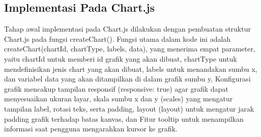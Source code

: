 \subsection{Implementasi Pada Chart.js}
Tahap awal implementasi pada Chart.js dilakukan dengan pembuatan struktur Chart.js pada fungsi createChart(). Fungsi utama dalam kode ini adalah createChart(chartId, chartType, labels, data), yang menerima empat parameter, yaitu chartId untuk memberi id grafik yang akan dibuat, chartType untuk mendefinisikan jenis chart yang akan dibuat, labels untuk menandakan sumbu x, dan variabel data yang akan ditampilkan di dalam grafik sumbu y,  Konfigurasi grafik mencakup tampilan responsif (responsive: true) agar grafik dapat menyesuaikan ukuran layar, skala sumbu x dan y (scales) yang mengatur tampilan label, rotasi teks, serta padding, layout (layout) untuk mengatur jarak padding grafik terhadap batas kanvas, dan Fitur tooltip untuk menampilkan informasi saat pengguna mengarahkan kursor ke grafik.
